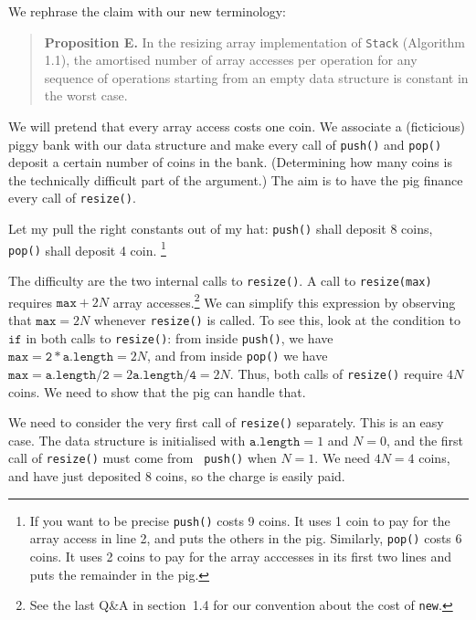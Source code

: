 \documentclass{tufte-handout}
\begin{document}
We rephrase the claim with our new terminology:

   
\begin{quote}{\bf\sf Proposition E.} 
  In the resizing array implementation of {\tt Stack} (Algorithm 1.1),
  the amortised number of array accesses per operation for any
  sequence of operations starting from an empty data structure is
  constant in the worst case.
\end{quote}

We will pretend that every array access costs one coin.  
We associate a (ficticious) piggy bank with our data structure and
make every call of {\tt push()} and {\tt pop()} deposit a certain
number of coins in the bank.  
(Determining how many coins is the technically difficult part of the
argument.) 
The aim is to have the pig finance every call of {\tt resize()}.

Let my pull the right constants out of my hat: {\tt push()} shall
deposit 8 coins, {\tt pop()} shall deposit 4 coin.%
\footnote{If you want to be precise {\tt push()} costs 9 coins. %
  It uses 1 coin to pay for the array access in line 2, and puts the
  others in the pig. %
  Similarly, {\tt pop()} costs 6 coins. %
  It uses 2 coins to pay for the array acccesses in its first two
  lines and puts the remainder in the pig.}

The difficulty are the two internal calls to {\tt resize()}.  
A call to {\tt resize(max)} requires $\mathtt{max}+ 2N$ array
accesses.\footnote{See the last Q\&A in section~1.4 for our convention
  about the cost of {\tt new}.}  
We can simplify this expression by observing that $\mathtt{max}=2N$
whenever {\tt resize()} is called.
To see this, look at the condition to $\mathtt{if}$ in both calls to
\texttt{resize()}: from inside \texttt{push()}, we have $\mathtt{max}=
\mathtt{2*a.length} = 2N$, and from inside \texttt{pop()} we have
$\mathtt{max}= \mathtt{a.length/2}= 2 \mathtt{a.length/4} = 2N$.
Thus, both calls of {\tt resize()} require $4N$ coins.  
We need to show that the pig can handle that.

We need to consider the very first call of {\tt resize()} separately.
This is an easy case.  
The data structure is initialised with $\mathtt{a.length}=1$ and
$N=0$, and the first call of {\tt resize()} must come from {\tt
  push()} when $N=1$.  
We need $4N=4$ coins, and have just deposited $8$ coins, so the charge
is easily paid.
\end{document}
